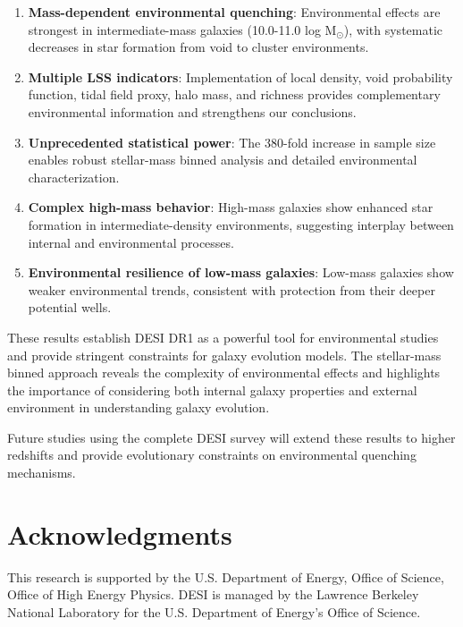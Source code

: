 \documentclass[twocolumn]{aastex701}
\begin{document}
\begin{enumerate}
\item \textbf{Mass-dependent environmental quenching}: Environmental effects are strongest in intermediate-mass galaxies (10.0-11.0 log M$_\odot$), with systematic decreases in star formation from void to cluster environments.

\item \textbf{Multiple LSS indicators}: Implementation of local density, void probability function, tidal field proxy, halo mass, and richness provides complementary environmental information and strengthens our conclusions.

\item \textbf{Unprecedented statistical power}: The 380-fold increase in sample size enables robust stellar-mass binned analysis and detailed environmental characterization.

\item \textbf{Complex high-mass behavior}: High-mass galaxies show enhanced star formation in intermediate-density environments, suggesting interplay between internal and environmental processes.

\item \textbf{Environmental resilience of low-mass galaxies}: Low-mass galaxies show weaker environmental trends, consistent with protection from their deeper potential wells.
\end{enumerate}

These results establish DESI DR1 as a powerful tool for environmental studies and provide stringent constraints for galaxy evolution models. The stellar-mass binned approach reveals the complexity of environmental effects and highlights the importance of considering both internal galaxy properties and external environment in understanding galaxy evolution.

Future studies using the complete DESI survey will extend these results to higher redshifts and provide evolutionary constraints on environmental quenching mechanisms.

\section{Acknowledgments}

This research is supported by the U.S. Department of Energy, Office of Science, Office of High Energy Physics. DESI is managed by the Lawrence Berkeley National Laboratory for the U.S. Department of Energy's Office of Science.



\end{document}
